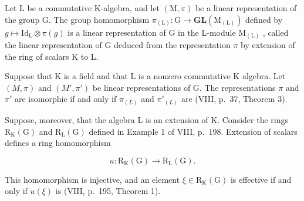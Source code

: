 Let L be a commutative K-algebra, and let \((\mathrm{M},\pi)\) be a linear representation of the group G. The group homomorphism \(\pi_{(\mathrm{L})}:\mathrm{G}\to\mathbf{GL}(\mathrm{M}_{(\mathrm{L})})\) defined by \(g\mapsto\mathrm{Id}_{\mathrm{L}}\otimes\pi(g)\) is a linear representation of G in the L-module \(\mathrm{M}_{(\mathrm{L})}\) , called the linear representation of G deduced from the representation \(\pi\) by extension of the ring of scalars K to L.

Suppose that K is a field and that L is a nonzero commutative K algebra. Let \((M,\pi)\) and \((M',\pi')\) be linear representations of G. The representations \(\pi\) and \(\pi'\) are isomorphic if and only if \(\pi_{(L)}\) and \(\pi'_{(L)}\) are (VIII, p.~37, Theorem 3).

Suppose, moreover, that the algebra L is an extension of K. Consider the rings \(\mathrm{R}_{\mathrm{K}}(\mathrm{G})\) and \(\mathrm{R}_{\mathrm{L}}(\mathrm{G})\) defined in Example 1 of VIII, p.~198. Extension of scalars defines a ring homomorphism

\[
u: \mathrm{R} _ {\mathrm{K}} (\mathrm{G}) \longrightarrow \mathrm{R} _ {\mathrm{L}} (\mathrm{G}).
\]

This homomorphism is injective, and an element \(\xi \in \mathrm{R}_{\mathrm{K}}(\mathrm{G})\) is effective if and only if \(u(\xi)\) is (VIII, p.~195, Theorem 1).

